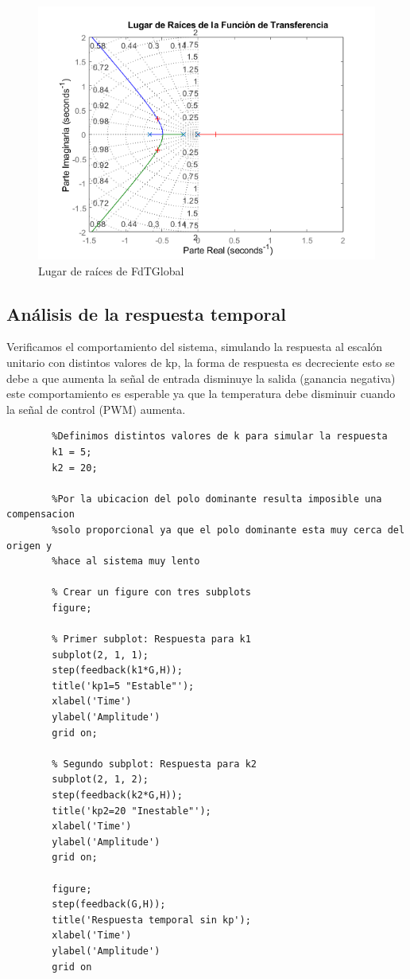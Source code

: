 \documentclass[12pt]{article}
\begin{document}
	\begin{figure}
		\includegraphics[width=1\linewidth]{Imagenes/Rlocus}
		\caption[Lugar de raíces de la función de transferencia global]{Lugar de raíces de FdTGlobal}
		\label{fig:rlocus}
	\end{figure}
	
	\subsection{Análisis de la respuesta temporal}
	Verificamos el comportamiento del sistema, simulando la respuesta al escalón unitario con distintos valores de kp, la forma de respuesta es decreciente esto se debe a que aumenta la señal de entrada disminuye la salida (ganancia negativa) este comportamiento es esperable ya que la temperatura debe disminuir cuando la señal de control (PWM) aumenta.
	
	\begin{lstlisting}
		%Definimos distintos valores de k para simular la respuesta 
		k1 = 5;
		k2 = 20;
		
		%Por la ubicacion del polo dominante resulta imposible una compensacion
		%solo proporcional ya que el polo dominante esta muy cerca del origen y
		%hace al sistema muy lento
		
		% Crear un figure con tres subplots
		figure;
		
		% Primer subplot: Respuesta para k1
		subplot(2, 1, 1);
		step(feedback(k1*G,H));
		title('kp1=5 "Estable"');
		xlabel('Time')
		ylabel('Amplitude')
		grid on;
		
		% Segundo subplot: Respuesta para k2
		subplot(2, 1, 2);
		step(feedback(k2*G,H));
		title('kp2=20 "Inestable"');
		xlabel('Time')
		ylabel('Amplitude')
		grid on;
		
		figure;
		step(feedback(G,H));
		title('Respuesta temporal sin kp');
		xlabel('Time')
		ylabel('Amplitude')
		grid on
	\end{lstlisting}
	
\end{document}
